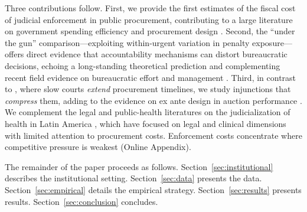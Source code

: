 Three contributions follow. First, we provide the first estimates of the fiscal cost of judicial enforcement in public procurement, contributing to a large literature on government spending efficiency and procurement design \citep{bandiera2009active, best2023procurement, decarolis2018buyer, lewisfaupel2016can, szucs2024discretion}. Second, the ``under the gun'' comparison---exploiting within-urgent variation in penalty exposure---offers direct evidence that accountability mechanisms can distort bureaucratic decisions, echoing a long-standing theoretical prediction \citep{prendergast2007bureaucrats} and complementing recent field evidence on bureaucratic effort and management \citep{rasul2018management, williams2021bureaucratic}. Third, in contrast to \citet{coviello2018court}, where slow courts \emph{extend} procurement timelines, we study injunctions that \emph{compress} them, adding to the evidence on ex ante design in auction performance \citep{coviello2018bidding, baltrunaite2021discretion}. We complement the legal and public-health literatures on the judicialization of health in Latin America \citep{wang2015right, ferraz2009right, biehl2009will}, which have focused on legal and clinical dimensions with limited attention to procurement costs. Enforcement costs concentrate where competitive pressure is weakest (Online Appendix).

The remainder of the paper proceeds as follows. Section~\ref{sec:institutional} describes the institutional setting. Section~\ref{sec:data} presents the data. Section~\ref{sec:empirical} details the empirical strategy. Section~\ref{sec:results} presents results. Section~\ref{sec:conclusion} concludes.
